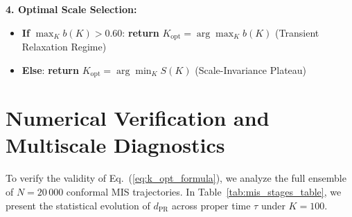 \documentclass[11pt,a4paper]{article}
\begin{document}
\begin{tcolorbox}[colback=gray!5!white,colframe=blue!75!black,title=\textbf{Algorithm 1: Adaptive Neighborhood Calibration and Local PR Dimension Estimation},fonttitle=\bfseries]
\textbf{4. Optimal Scale Selection:}
\begin{itemize}
    \item \textbf{If} $\max_{K} b(K) > 0.60$: \textbf{return} $K_{\mathrm{opt}} = \arg\max_{K} b(K)$ \hfill (Transient Relaxation Regime)
    \item \textbf{Else}: \textbf{return} $K_{\mathrm{opt}} = \arg\min_{K} S(K)$ \hfill (Scale-Invariance Plateau)
\end{itemize}
\end{tcolorbox}

\section{Numerical Verification and Multiscale Diagnostics}
\label{sec:numerical_results}
To verify the validity of Eq.~(\ref{eq:k_opt_formula}), we analyze the full ensemble of $N = 20\,000$ conformal MIS trajectories. In Table~\ref{tab:mis_stages_table}, we present the statistical evolution of $d_{\mathrm{PR}}$ across proper time $\tau$ under $K = 100$.
\end{document}
